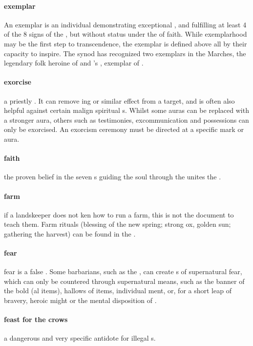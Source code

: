 \paragraph{exemplar} An exemplar is an individual demonstrating exceptional , and fulfilling at least 4 of the 8 signs of the , but without status under the  of faith. While exemplarhood may be the first step to transcendence, the exemplar is defined above all by their capacity to inspire. The synod has recognized two exemplars in the Marches, the legendary folk heroine  of  and 's , exemplar of .
\paragraph{exorcise} a priestly . It can remove ing or similar effect from a target, and is often also helpful against certain malign spiritual s. Whilst some auras can be replaced with a stronger aura, others such as testimonies, excommunication and possessions can only be exorcised. An exorcism ceremony must be directed at a specific mark or aura. 
\paragraph{faith} the proven belief in the seven s guiding the soul through the  unites the .
\paragraph{farm} if a landskeeper does not ken how to run a farm, this is not the document to teach them. Farm rituals (blessing of the new spring; strong ox, golden sun; gathering the harvest) can be found in the .
\paragraph{fear} fear is a false . Some barbarians, such as the , can create s of supernatural fear, which can only be countered through supernatural means, such as the banner of the bold (al items), hallows of items, individual ment, or, for a short leap of bravery, heroic might or the mental disposition of . 
\paragraph{feast for the crows} a dangerous and very specific antidote for illegal s.
